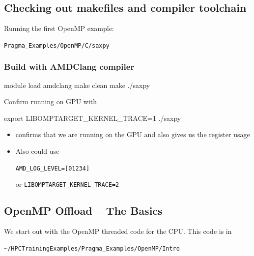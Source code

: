\documentclass[
]{article}
\providecommand{\tightlist}{%
  \setlength{\itemsep}{0pt}\setlength{\parskip}{0pt}}
\let\oldtexttt\texttt
\renewcommand{\texttt}[1]{
  \colorbox{Light}{\oldtexttt{#1}}
}
\newenvironment{Shaded}{}{}
\newcommand{\BuiltInTok}[1]{#1}
\newcommand{\ExtensionTok}[1]{#1}
\newcommand{\FunctionTok}[1]{\textcolor[rgb]{0.02,0.16,0.49}{#1}}
\newcommand{\NormalTok}[1]{#1}
\newcommand{\VariableTok}[1]{\textcolor[rgb]{0.10,0.09,0.49}{#1}}
\providecommand{\tightlist}{%
  \setlength{\itemsep}{0pt}\setlength{\parskip}{0pt}}
\begin{document}
\hypertarget{checking-out-makefiles-and-compiler-toolchain}{%
\subsection{Checking out makefiles and compiler
toolchain}\label{checking-out-makefiles-and-compiler-toolchain}}

Running the first OpenMP example:
\texttt{Pragma\_Examples/OpenMP/C/saxpy}

\hypertarget{build-with-amdclang-compiler}{%
\subsubsection{Build with AMDClang
compiler}\label{build-with-amdclang-compiler}}

\begin{Shaded}
\begin{Highlighting}[]
\ExtensionTok{module}\NormalTok{ load amdclang}
\FunctionTok{make}\NormalTok{ clean }
\FunctionTok{make}
\ExtensionTok{./saxpy}
\end{Highlighting}
\end{Shaded}

Confirm running on GPU with

\begin{Shaded}
\begin{Highlighting}[]
\BuiltInTok{export} \VariableTok{LIBOMPTARGET\_KERNEL\_TRACE=}\NormalTok{1 }
\ExtensionTok{./saxpy}
\end{Highlighting}
\end{Shaded}

\begin{itemize}
\tightlist
\item
  confirms that we are running on the GPU and also gives us the register
  usage
\item
  Also could use
  \texttt{AMD\_LOG\_LEVEL={[}0\textbar{}1\textbar{}2\textbar{}3\textbar{}4{]}}
  or \texttt{LIBOMPTARGET\_KERNEL\_TRACE=2}
\end{itemize}

\hypertarget{openmp-offload-the-basics}{%
\subsection{OpenMP Offload -- The
Basics}\label{openmp-offload-the-basics}}

We start out with the OpenMP threaded code for the CPU. This code is in

\texttt{\textasciitilde{}/HPCTrainingExamples/Pragma\_Examples/OpenMP/Intro}
\end{document}
